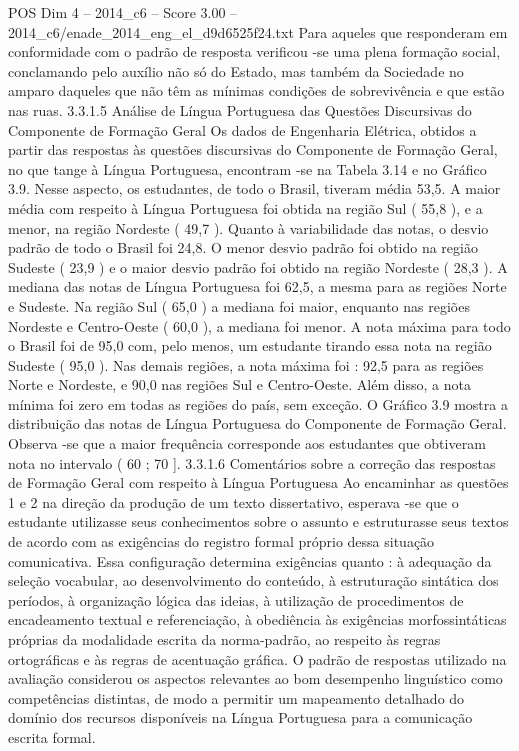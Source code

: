 \begin{textsample}{POS Dim 4 – 2014\_c6 – Score 3.00 – 2014\_c6/enade\_2014\_eng\_el\_d9d6525f24.txt}
Para aqueles que responderam em conformidade com o padrão de resposta verificou -se uma plena formação social, conclamando pelo auxílio não só do Estado, mas também da Sociedade no amparo daqueles que não têm as mínimas condições de sobrevivência e que estão nas ruas. 3.3.1.5 Análise de Língua Portuguesa das Questões Discursivas do Componente de Formação Geral Os dados de Engenharia Elétrica, obtidos a partir das respostas às questões discursivas do Componente de Formação Geral, no que tange à Língua Portuguesa, encontram -se na Tabela 3.14 e no Gráfico 3.9.
Nesse aspecto, os estudantes, de todo o Brasil, tiveram média 53,5.
A maior média com respeito à Língua Portuguesa foi obtida na região Sul ( 55,8 ), e a menor, na região Nordeste ( 49,7 ).
Quanto à variabilidade das notas, o desvio padrão de todo o Brasil foi 24,8.
O menor desvio padrão foi obtido na região Sudeste ( 23,9 ) e o maior desvio padrão foi obtido na região Nordeste ( 28,3 ).
A mediana das notas de Língua Portuguesa foi 62,5, a mesma para as regiões Norte e Sudeste.
Na região Sul ( 65,0 ) a mediana foi maior, enquanto nas regiões Nordeste e Centro-Oeste ( 60,0 ), a mediana foi menor.
A nota máxima para todo o Brasil foi de 95,0 com, pelo menos, um estudante tirando essa nota na região Sudeste ( 95,0 ).
Nas demais regiões, a nota máxima foi : 92,5 para as regiões Norte e Nordeste, e 90,0 nas regiões Sul e Centro-Oeste.
Além disso, a nota mínima foi zero em todas as regiões do país, sem exceção.
O Gráfico 3.9 mostra a distribuição das notas de Língua Portuguesa do Componente de Formação Geral.
Observa -se que a maior frequência corresponde aos estudantes que obtiveram nota no intervalo ( 60 ; 70 ]. 3.3.1.6 Comentários sobre a correção das respostas de Formação Geral com respeito à Língua Portuguesa Ao encaminhar as questões 1 e 2 na direção da produção de um texto dissertativo, esperava -se que o estudante utilizasse seus conhecimentos sobre o assunto e estruturasse seus textos de acordo com as exigências do registro formal próprio dessa situação comunicativa.
Essa configuração determina exigências quanto : à adequação da seleção vocabular, ao desenvolvimento do conteúdo, à estruturação sintática dos períodos, à organização lógica das ideias, à utilização de procedimentos de encadeamento textual e referenciação, à obediência às exigências morfossintáticas próprias da modalidade escrita da norma-padrão, ao respeito às regras ortográficas e às regras de acentuação gráfica.
O padrão de respostas utilizado na avaliação considerou os aspectos relevantes ao bom desempenho linguístico como competências distintas, de modo a permitir um mapeamento detalhado do domínio dos recursos disponíveis na Língua Portuguesa para a comunicação escrita formal.

\end{textsample}
